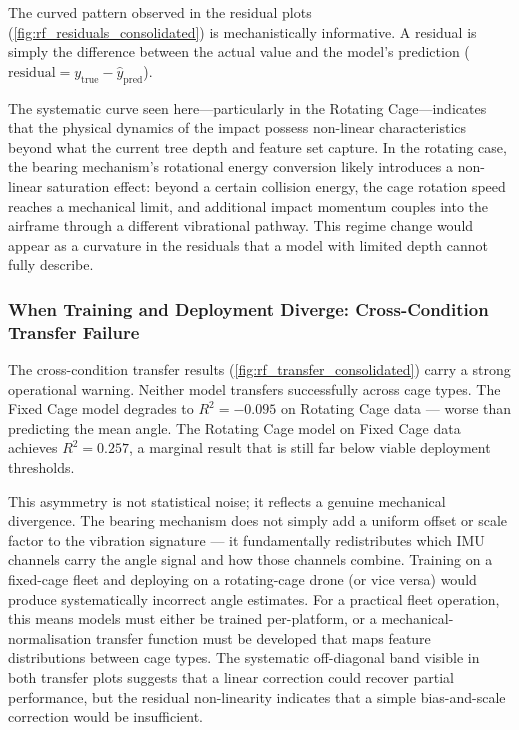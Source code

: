 The curved pattern observed in the residual plots (\autoref{fig:rf_residuals_consolidated}) is mechanistically informative. A residual is simply the difference between the actual value and the model's prediction ($\text{residual} = y_{\text{true}} - \hat{y}_{\text{pred}}$).

The systematic curve seen here---particularly in the Rotating Cage---indicates that the physical dynamics of the impact possess non-linear characteristics beyond what the current tree depth and feature set capture. In the rotating case, the bearing mechanism's rotational energy conversion likely introduces a non-linear saturation effect: beyond a certain collision energy, the cage rotation speed reaches a mechanical limit, and additional impact momentum couples into the airframe through a different vibrational pathway. This regime change would appear as a curvature in the residuals that a model with limited depth cannot fully describe.

\subsubsection{When Training and Deployment Diverge: Cross-Condition Transfer Failure}

The cross-condition transfer results (\autoref{fig:rf_transfer_consolidated}) carry a strong operational warning. Neither model transfers successfully across cage types. The Fixed Cage model degrades to $R^2 = -0.095$ on Rotating Cage data --- worse than predicting the mean angle. The Rotating Cage model on Fixed Cage data achieves $R^2 = 0.257$, a marginal result that is still far below viable deployment thresholds.

This asymmetry is not statistical noise; it reflects a genuine mechanical divergence. The bearing mechanism does not simply add a uniform offset or scale factor to the vibration signature --- it fundamentally redistributes which IMU channels carry the angle signal and how those channels combine. Training on a fixed-cage fleet and deploying on a rotating-cage drone (or vice versa) would produce systematically incorrect angle estimates. For a practical fleet operation, this means models must either be trained per-platform, or a mechanical-normalisation transfer function must be developed that maps feature distributions between cage types. The systematic off-diagonal band visible in both transfer plots suggests that a linear correction could recover partial performance, but the residual non-linearity indicates that a simple bias-and-scale correction would be insufficient.

